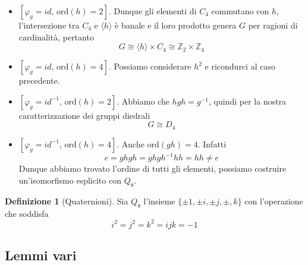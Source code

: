 \documentclass[a4paper]{article}
\theoremstyle{remark}
\theoremstyle{definition}
\newtheorem{definition}[theorem]{Definizione}
\begin{document}
\begin{multicols}{2}
\begin{itemize}
	\item $ \left[\varphi_g =  id, \, \text{ord}(h) =2\right] $. Dunque gli elementi di $ C_4 $ commutano con $ h $, l'intersezione tra $ C_4 $ e $ \langle h \rangle $ è banale e il loro prodotto genera $ G $ per ragioni di cardinalità, pertanto \[ G \cong  \langle h \rangle\times C_4  \cong  \mathbb{Z}_2\times\mathbb{Z}_4 \]
	\item $ \left[\varphi_g =  id, \, \text{ord}(h) =4\right] $. Possiamo considerare $ h^2 $ e ricondurci al caso precedente.
	\item $ \left[\varphi_g =  id^{-1}, \, \text{ord}(h) =2\right] $. Abbiamo che $ hgh = g^{-1} $, quindi per la nostra caratterizzazione dei gruppi diedrali \[ G \cong D_4 \]
	\item $ \left[\varphi_g =  id^{-1}, \, \text{ord}(h) =4\right] $. Anche ord$ (gh) = 4 $. Infatti
	\[ e = ghgh = ghgh^{-1}hh = hh \neq e \]
	Dunque abbiamo trovato l'ordine di tutti gli elementi, possiamo costruire un'isomorfismo esplicito con $ Q_8 $.
\end{itemize}
\begin{definition}[Quaternioni]
	Sia $ Q_8 $ l'insieme $ \{ \pm 1, \pm i, \pm j, \pm, k \} $ con l'operazione che soddisfa
	\[ i^2 = j^2 = k^2 = ijk = -1 \]
\end{definition}
\end{multicols}

\subsection{Lemmi vari}
\end{document}
